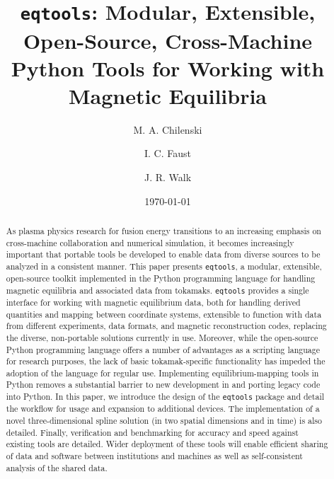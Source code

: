 \documentclass[12pt,floatfix,showpacs]{revtex4-1}
\newcommand{\eqtools}{\texttt{eqtools}\xspace}
\begin{document}
\title{\eqtools: Modular, Extensible, Open-Source, Cross-Machine Python Tools for Working with Magnetic Equilibria}

\author{M. A. Chilenski}

\author{I. C. Faust}

\author{J. R. Walk}

\date{\today}

\begin{abstract}
As plasma physics research for fusion energy transitions to an increasing emphasis on cross-machine collaboration and numerical simulation, it becomes increasingly important that portable tools be developed to enable data from diverse sources to be analyzed in a consistent manner. 
This paper presents \eqtools, a modular, extensible, open-source toolkit implemented in the Python programming language for handling magnetic equilibria and associated data from tokamaks. 
\eqtools provides a single interface for working with magnetic equilibrium data, both for handling derived quantities and mapping between coordinate systems, extensible to function with data from different experiments, data formats, and magnetic reconstruction codes, replacing the diverse, non-portable solutions currently in use.  
Moreover, while the open-source Python programming language offers a number of advantages as a scripting language for research purposes, the lack of basic tokamak-specific functionality has impeded the adoption of the language for regular use.
Implementing equilibrium-mapping tools in Python removes a substantial barrier to new development in and porting legacy code into Python.
In this paper, we introduce the design of the \eqtools package and detail the workflow for usage and expansion to additional devices.  The implementation of a novel three-dimensional spline solution (in two spatial dimensions and in time) is also detailed.  
Finally, verification and benchmarking for accuracy and speed against existing tools are detailed. Wider deployment of these tools will enable efficient sharing of data and software between institutions and machines as well as self-consistent analysis of the shared data.
\end{abstract}


\maketitle
\end{document}
